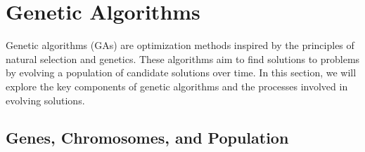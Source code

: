 

    \section{Genetic Algorithms} \label{sec:ga}
    
    Genetic algorithms (GAs) are optimization methods inspired by the principles of natural selection and genetics. These algorithms aim to find solutions to problems by evolving a population of candidate solutions over time. In this section, we will explore the key components of genetic algorithms and the processes involved in evolving solutions.
    
    \subsection{Genes, Chromosomes, and Population}
    

